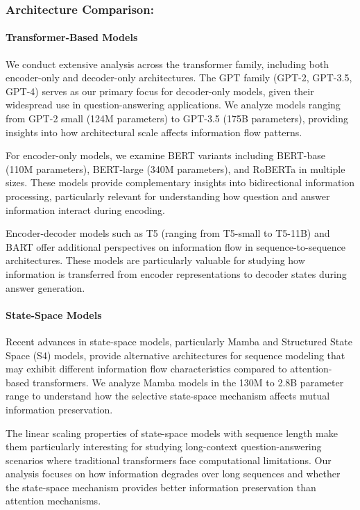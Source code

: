 \subsubsection{Architecture Comparison:}

\paragraph{Transformer-Based Models}
We conduct extensive analysis across the transformer family, including both encoder-only and decoder-only architectures. The GPT family (GPT-2, GPT-3.5, GPT-4) serves as our primary focus for decoder-only models, given their widespread use in question-answering applications. We analyze models ranging from GPT-2 small (124M parameters) to GPT-3.5 (175B parameters), providing insights into how architectural scale affects information flow patterns.

For encoder-only models, we examine BERT variants including BERT-base (110M parameters), BERT-large (340M parameters), and RoBERTa in multiple sizes. These models provide complementary insights into bidirectional information processing, particularly relevant for understanding how question and answer information interact during encoding.

Encoder-decoder models such as T5 (ranging from T5-small to T5-11B) and BART offer additional perspectives on information flow in sequence-to-sequence architectures. These models are particularly valuable for studying how information is transferred from encoder representations to decoder states during answer generation.

\paragraph{State-Space Models}
Recent advances in state-space models, particularly Mamba and Structured State Space (S4) models, provide alternative architectures for sequence modeling that may exhibit different information flow characteristics compared to attention-based transformers. We analyze Mamba models in the 130M to 2.8B parameter range to understand how the selective state-space mechanism affects mutual information preservation.

The linear scaling properties of state-space models with sequence length make them particularly interesting for studying long-context question-answering scenarios where traditional transformers face computational limitations. Our analysis focuses on how information degrades over long sequences and whether the state-space mechanism provides better information preservation than attention mechanisms.

